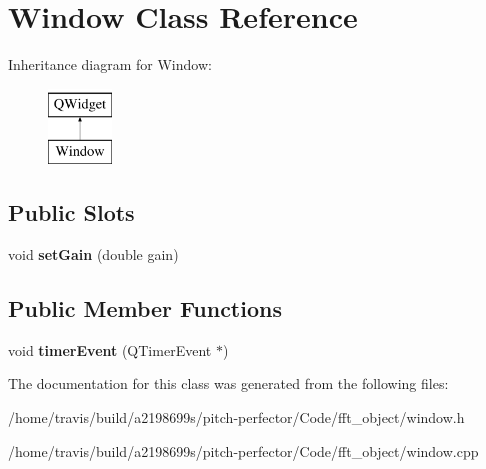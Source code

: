 \hypertarget{classWindow}{\section{Window Class Reference}
\label{classWindow}
}
Inheritance diagram for Window\-:\begin{figure}[H]
\begin{center}
\leavevmode
\includegraphics[height=2.000000cm]{classWindow}
\end{center}
\end{figure}
\subsection*{Public Slots}
\begin{DoxyCompactItemize}
\item 
\hypertarget{classWindow_a06531ce47a4206b3dbef30587e768b29}{void {\bfseries set\-Gain} (double gain)}\label{classWindow_a06531ce47a4206b3dbef30587e768b29}

\end{DoxyCompactItemize}
\subsection*{Public Member Functions}
\begin{DoxyCompactItemize}
\item 
\hypertarget{classWindow_a3656e486c467d9d7c7933812fb4b8f57}{void {\bfseries timer\-Event} (Q\-Timer\-Event $\ast$)}\label{classWindow_a3656e486c467d9d7c7933812fb4b8f57}

\end{DoxyCompactItemize}


The documentation for this class was generated from the following files\-:\begin{DoxyCompactItemize}
\item 
/home/travis/build/a2198699s/pitch-\/perfector/\-Code/fft\-\_\-object/window.\-h\item 
/home/travis/build/a2198699s/pitch-\/perfector/\-Code/fft\-\_\-object/window.\-cpp\end{DoxyCompactItemize}
